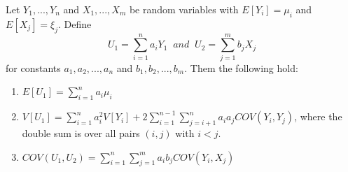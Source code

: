 \documentclass[12pt, a4paper, twoside, openright, titlepage]{book}
\begin{document}
\begin{thm}{}{}
    Let $Y_1,...,Y_n$ and $X_1,...,X_m$ be random variables with $E[Y_i] = \mu_i$ and $E[X_j] = \xi_j$. Define \begin{equation*}
        U_1 = \sum\limits_{i=1}^na_iY_1\;\;and\;\;U_2 = \sum\limits_{j=1}^mb_jX_j
    \end{equation*}
    for constants $a_1,a_2,...,a_n$ and $b_1,b_2,...,b_m$. Them the following hold: \begin{enumerate}
        \item $E[U_1] = \sum\limits_{i=1}^na_i\mu_i$
        \item $V[U_1] = \sum\limits_{i=1}^na_i^2V[Y_i] + 2\sum\limits_{i=1}^{n-1}\sum\limits_{j=i+1}^na_ia_jCOV(Y_i,Y_j)$, where the double sum is over all pairs $(i,j)$ with $i < j$.
        \item $COV(U_1,U_2) = \sum\limits_{i=1}^n\sum\limits_{j=1}^ma_ib_jCOV(Y_i,X_j)$
    \end{enumerate}
\end{thm}
\end{document}
